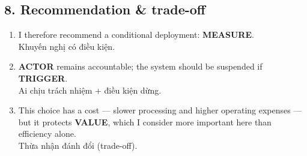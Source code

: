\documentclass[11pt,a4paper]{article}
\newcommand{\vitext}[1]{{\small\color{tipc}#1}}
\newcommand{\slot}[1]{{\setlength{\fboxsep}{1.2pt}\colorbox{slotbg}{\sffamily\scriptsize\bfseries\color{RoyalBlue}#1}}}
\begin{document}
\subsection*{8. Recommendation \& trade-off}\begin{enumerate}[leftmargin=1.6em]
\item I therefore recommend a conditional deployment: \slot{MEASURE}.\\\vitext{Khuyến nghị có điều kiện.}
\item \slot{ACTOR} remains accountable; the system should be suspended if \slot{TRIGGER}.\\\vitext{Ai chịu trách nhiệm + điều kiện dừng.}
\item This choice has a cost — slower processing and higher operating expenses — but it protects \slot{VALUE}, which I consider more important here than efficiency alone.\\\vitext{Thừa nhận đánh đổi (trade-off).}
\end{enumerate}
\end{document}
